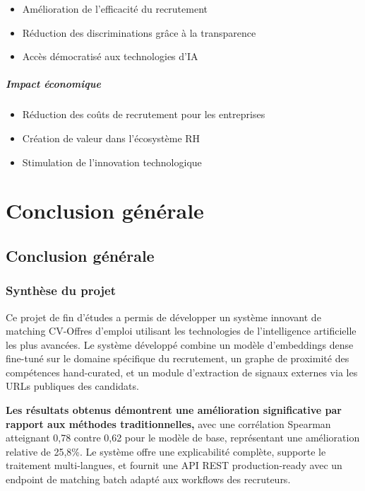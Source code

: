 \documentclass[12pt,a4paper]{report}
\begin{document}
\begin{itemize}
\item Amélioration de l'efficacité du recrutement
\item Réduction des discriminations grâce à la transparence
\item Accès démocratisé aux technologies d'IA
\end{itemize}

\subsubsection{Impact économique}

\begin{itemize}
\item Réduction des coûts de recrutement pour les entreprises
\item Création de valeur dans l'écosystème RH
\item Stimulation de l'innovation technologique
\end{itemize}

\part{Conclusion générale}
\chapter{Conclusion générale}

\section{Synthèse du projet}

Ce projet de fin d'études a permis de développer un système innovant de matching CV-Offres d'emploi utilisant les technologies de l'intelligence artificielle les plus avancées. Le système développé combine un modèle d'embeddings dense fine-tuné sur le domaine spécifique du recrutement, un graphe de proximité des compétences hand-curated, et un module d'extraction de signaux externes via les URLs publiques des candidats.

{\color{primarygreen}\large\textbf{Les résultats obtenus démontrent une amélioration significative par rapport aux méthodes traditionnelles,}} avec une corrélation Spearman atteignant 0,78 contre 0,62 pour le modèle de base, représentant une amélioration relative de 25,8\%. Le système offre une explicabilité complète, supporte le traitement multi-langues, et fournit une API REST production-ready avec un endpoint de matching batch adapté aux workflows des recruteurs.
\end{document}
